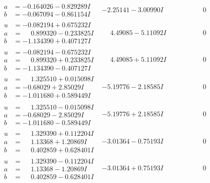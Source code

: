 \documentclass[1p]{elsarticle_modified}
\theoremstyle{definition}
\begin{document}
$$\begin{array}{c|c|c}
\begin{aligned}
a &= -0.164026 - 0.829289 I \\
b &= -0.067094 - 0.861154 I\end{aligned}
 & -2.25141 - 3.00990 I & \phantom{-0.000000 } 0 \\ \hline\begin{aligned}
u &= -0.082194 + 0.675232 I \\
a &= \phantom{-}0.899320 - 0.233825 I \\
b &= -1.134390 + 0.407127 I\end{aligned}
 & \phantom{-}4.49085 - 5.11092 I & \phantom{-0.000000 } 0 \\ \hline\begin{aligned}
u &= -0.082194 - 0.675232 I \\
a &= \phantom{-}0.899320 + 0.233825 I \\
b &= -1.134390 - 0.407127 I\end{aligned}
 & \phantom{-}4.49085 + 5.11092 I & \phantom{-0.000000 } 0 \\ \hline\begin{aligned}
u &= \phantom{-}1.325510 + 0.015098 I \\
a &= -0.68029 + 2.85029 I \\
b &= -1.011680 + 0.589449 I\end{aligned}
 & -5.19776 - 2.18585 I & \phantom{-0.000000 } 0 \\ \hline\begin{aligned}
u &= \phantom{-}1.325510 - 0.015098 I \\
a &= -0.68029 - 2.85029 I \\
b &= -1.011680 - 0.589449 I\end{aligned}
 & -5.19776 + 2.18585 I & \phantom{-0.000000 } 0 \\ \hline\begin{aligned}
u &= \phantom{-}1.329390 + 0.112204 I \\
a &= \phantom{-}1.13368 + 1.20869 I \\
b &= \phantom{-}0.402859 + 0.628401 I\end{aligned}
 & -3.01364 - 0.75193 I & \phantom{-0.000000 } 0 \\ \hline\begin{aligned}
u &= \phantom{-}1.329390 - 0.112204 I \\
a &= \phantom{-}1.13368 - 1.20869 I \\
b &= \phantom{-}0.402859 - 0.628401 I\end{aligned}
 & -3.01364 + 0.75193 I & \phantom{-0.000000 } 0\\

\end{array}$$
\end{document}
